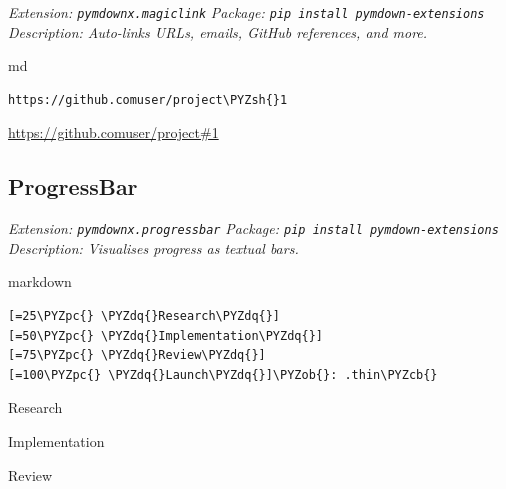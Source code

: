 \documentclass[a4paper,twoside]{article}
\begin{document}
\emph{Extension: \texttt{pymdownx.magiclink}}
\emph{Package: \texttt{pip install pymdown-\allowbreak{}extensions}}
\emph{Description: Auto-links URLs, emails, GitHub references, and more.}

\begin{code}{md}{}{}
\begin{Verbatim}[commandchars=\\\{\},breaklines, breakanywhere, commandchars=\\\{\}]
https://github.comuser/project\PYZsh{}1
\end{Verbatim}
\end{code}
\begin{displayquote}

\href{https://github.comuser/project\#1}{https://github.comuser/project\#1}

\end{displayquote}
\subsection{ProgressBar}\label{progressbar}

\emph{Extension: \texttt{pymdownx.progressbar}}
\emph{Package: \texttt{pip install pymdown-\allowbreak{}extensions}}
\emph{Description: Visualises progress as textual bars.}

\begin{code}{markdown}{}{}
\begin{Verbatim}[commandchars=\\\{\},breaklines, breakanywhere, commandchars=\\\{\}]
[=25\PYZpc{} \PYZdq{}Research\PYZdq{}]
[=50\PYZpc{} \PYZdq{}Implementation\PYZdq{}]
[=75\PYZpc{} \PYZdq{}Review\PYZdq{}]
[=100\PYZpc{} \PYZdq{}Launch\PYZdq{}]\PYZob{}: .thin\PYZcb{}
\end{Verbatim}
\end{code}
{ Research}\par

{ Implementation}\par

{ Review}\par
\end{document}
